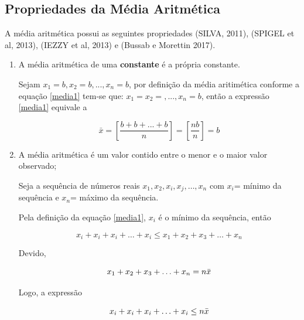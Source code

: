 \newpage
\subsection{Propriedades da Média Aritmética}

A média aritmética possui as seguintes propriedades (SILVA, 2011), (SPIGEL et al, 2013), (IEZZY et al, 2013) e (Bussab e Morettin 2017). 

\begin{enumerate}
\item [{A)}] A média aritmética de uma \textbf{constante} é a própria constante.

\vskip0.3cm
\textbf{} 

Sejam  $x_{1}=b, x_{2}=b, ..., x_{n}=b$, por definição da média aritimética conforme a equação \ref{media1} tem-se que: $x_{1}=x_{2}=,..., x_{n}=b$, então a expressão \ref{media1} equivale a

\begin{equation*}\label{propriedade1}
\bar{x} = \left[ \frac{b+b+...+b}{n} \right ] = \left [\frac{nb}{n} \right ]= b
\end{equation*}
 

\item [{B)}] A média aritmética é um valor contido entre o menor e o maior valor observado; 

\vskip0.3cm
\textbf{} 

Seja a sequência de números reais $x_{1},x_{2},x_{i},x_{j},\ldots,x_{n}$ com $x_{i}$= mínimo da sequência e $x_{n}$= máximo da sequência. \vskip0.3cm

Pela definição da equação \ref{media1}, $x_{i}$ é o mínimo da sequência, então 

\begin{equation*}\label{propriedade1}
x_{i}+x_{i}+x_{i}+\ldots+x_{i} \leq  x_{1}+x_{2}+x_{3}+\ldots+x_{n}
\end{equation*}

Devido,

\begin{equation*}\label{propriedade1}
x_{1}+x_{2}+x_{3}+\ldots+x_{n}=n \Bar{x}
\end{equation*}

Logo, a expressão

\begin{equation*}\label{propriedade1}
x_{i}+x_{i}+x_{i}+\ldots+x_{i} \leq n \Bar{x}
\end{equation*}


\end{enumerate}
